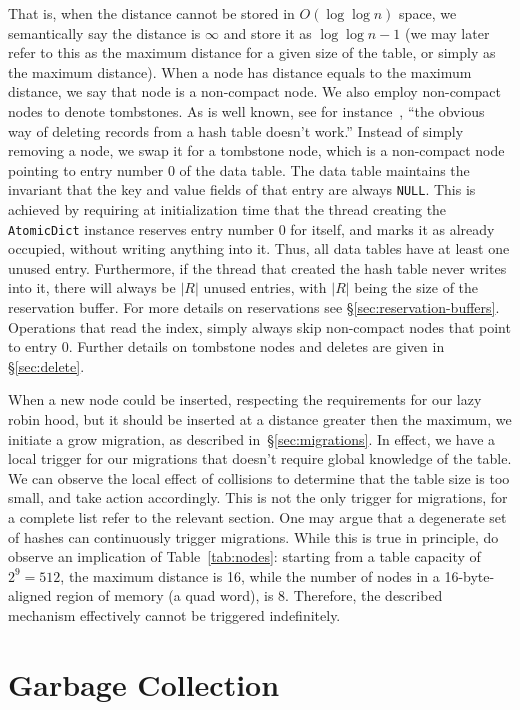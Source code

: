 That is, when the distance cannot be stored in $O(\log \log n)$ space, we semantically say the distance is $\infty$ and store it as $\log \log n - 1$ (we may later refer to this as the maximum distance for a given size of the table, or simply as the maximum distance).
When a node has distance equals to the maximum distance, we say that node is a non-compact node.
We also employ non-compact nodes to denote tombstones.
As is well known, see for instance~\cite[\S6.4]{the-art-vol-2}, ``the obvious way of deleting records from a hash table doesn't work.''
Instead of simply removing a node, we swap it for a tombstone node, which is a non-compact node pointing to entry number 0 of the data table.
The data table maintains the invariant that the key and value fields of that entry are always \texttt{NULL}.
This is achieved by requiring at initialization time that the thread creating the \texttt{AtomicDict} instance reserves entry number 0 for itself, and marks it as already occupied, without writing anything into it.
Thus, all data tables have at least one unused entry.
Furthermore, if the thread that created the hash table never writes into it, there will always be $|R|$ unused entries, with $|R|$ being the size of the reservation buffer.
For more details on reservations see \S\ref{sec:reservation-buffers}.
Operations that read the index, simply always skip non-compact nodes that point to entry 0.
Further details on tombstone nodes and deletes are given in \S\ref{sec:delete}.

When a new node could be inserted, respecting the requirements for our lazy robin hood, but it should be inserted at a distance greater then the maximum, we initiate a grow migration, as described in~\S\ref{sec:migrations}.
In effect, we have a local trigger for our migrations that doesn't require global knowledge of the table.
We can observe the local effect of collisions to determine that the table size is too small, and take action accordingly.
This is not the only trigger for migrations, for a complete list refer to the relevant section.
One may argue that a degenerate set of hashes can continuously trigger migrations.
While this is true in principle, do observe an implication of Table~\ref{tab:nodes}: starting from a table capacity of $2^9 = 512$, the maximum distance is 16, while the number of nodes in a 16-byte-aligned region of memory (a quad word), is 8.
Therefore, the described mechanism effectively cannot be triggered indefinitely.


\section{Garbage Collection}\label{sec:garbage-collection}

